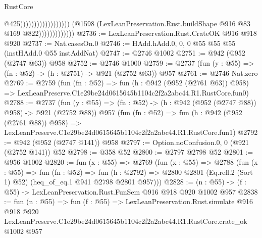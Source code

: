 \begin{lexlean}{RustCore}
\begin{coremodule}
                                                              @425))))))))))))))))))
                          (@1598
                            (LexLeanPreservation.Rust.buildShape @916 @83 @169 @822)))))))))))))
@2736 := LexLeanPreservation.Rust.CrateOK @916 @918 @920
@2737 := Nat.casesOn.{0}
@2746 := HAdd.hAdd.{0, 0, 0} @55 @55 @55 (instHAdd.{0} @55 instAddNat)
@2747 := @2746 @1002
@2751 := @942 (@952 (@2747 @63)) @958
@2752 := @2746 @1000
@2759 := @2737 (fun (y : @55) => (fn : @52) -> (h : @2751) -> @921 (@2752 @63)) @957
@2761 := @2746 Nat.zero
@2769 := @2759
    (fun (fn : @52) =>
    fun (h : @942 (@952 (@2761 @63)) @958) =>
    LexLeanPreserve.C1e29be24d0615645b1104c2f2a2abc44.R1.RustCore.fun0)
@2788 := @2737
    (fun (y : @55) => (fn : @52) -> (h : @942 (@952 (@2747 @88)) @958) -> @921 (@2752 @88))
    @957
    (fun (fn : @52) =>
    fun (h : @942 (@952 (@2761 @88)) @958) =>
    LexLeanPreserve.C1e29be24d0615645b1104c2f2a2abc44.R1.RustCore.fun1)
@2792 := @942 (@952 (@2747 @141)) @958
@2797 := Option.noConfusion.{0, 0} (@921 (@2752 @141)) @52
@2798 := @358 @52
@2800 := @2797 @2798 @52
@2801 := @956 @1002
@2820 := fun (x : @55) =>
  @2769
    (fun (x : @55) =>
    @2788
      (fun (x : @55) =>
      fun (fn : @52) =>
      fun (h : @2792) =>
      @2800 @2801 (Eq.refl.{2} (Sort 1) @52) (heq_of_eq.{1} @941 @2798 @2801 @957)))
@2828 := (n : @55) -> (f : @55) -> LexLeanPreservation.Rust.FunSem @916 @918 @920 @1002 @957
@2838 := fun (n : @55) =>
  fun (f : @55) =>
  LexLeanPreservation.Rust.simulate
    @916
    @918
    @920
    LexLeanPreserve.C1e29be24d0615645b1104c2f2a2abc44.R1.RustCore.crate_ok
    @1002
    @957
\end{coremodule}
\end{lexlean}
